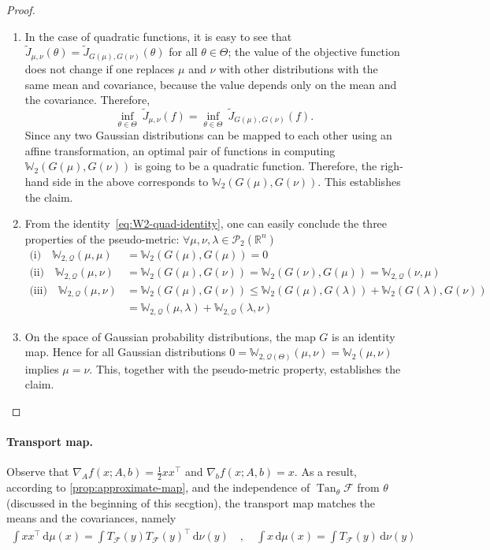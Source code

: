 \documentclass[10pt]{article}
\newcommand{\ud}{\,\mathrm{d}}
\newcommand{\op}[1]{\operatorname{#1}}
\newcommand{\Tan}{\op{Tan}}
\renewcommand{\tilde}{\widetilde}
\newcommand{\real}{\mathbb{R}}
\newcommand{\W}{\mathds{W}}
\newcommand{\calF}{\mathcal{F}}
\newcommand{\Q}{\mathcal{Q}}
\numberwithin{equation}{section}
\begin{document}
\begin{proof}
	\begin{enumerate}
		\item 
		In the case of quadratic functions, it is easy to see that $\tilde J_{\mu,\nu}(\theta) = \tilde J_{G(\mu),G(\nu)}(\theta)$ for all $\theta \in \Theta$; 
		the value of the objective function does not change if one replaces $\mu$ and $\nu$ with other distributions with the same mean and covariance, because the value depends only on the mean and the covariance. Therefore, 
		\begin{equation*}%
		\inf_{\theta\in \Theta}~ \tilde J_{\mu,\nu}(f) = \inf_{\theta\in\Theta}~\tilde J_{G(\mu),G(\nu)}(f).
		\end{equation*}
		Since any two Gaussian distributions can be mapped to each other using an affine transformation, an optimal pair of functions in computing $\W_{2}(G(\mu),G(\nu))$ is going to be a quadratic function. Therefore, the righ-hand side in the above corresponds to $\W_{2}(G(\mu),G(\nu))$. 
		This establishes the claim. 
		
		\item From the identity~\eqref{eq:W2-quad-identity}, one can easily conclude the three properties of the pseudo-metric: $\forall \mu,\nu,\lambda \in \mathcal{P}_2(\real^n)$ 
		\begin{align*}
		\text{(i)}\quad \W_{2,\Q}(\mu,\mu)&=\W_2(G(\mu),G(\mu))= 0\\
		\text{(ii)}\quad \W_{2,\Q}(\mu,\nu) &= \W_2(G(\mu),G(\nu)) = \W_2(G(\nu),G(\mu))=\W_{2,\Q}(\nu,\mu)\\
		\text{(iii)}\quad \W_{2,\Q}(\mu,\nu) &= \W_2(G(\mu),G(\nu)) \leq \W_2(G(\mu),G(\lambda)) + \W_2(G(\lambda),G(\nu)) \\&= \W_{2,\Q}(\mu,\lambda) + \W_{2,\Q}(\lambda,\nu)
		\end{align*}
		\item On the space of Gaussian probability distributions, the map $G$ is an identity map. Hence for all Gaussian distributions $0 = \W_{2,\Q(\Theta)}(\mu,\nu) = \W_2(\mu,\nu)$ implies $\mu=\nu$. This, together with the pseudo-metric property, establishes the claim. 
		
	\end{enumerate}
\end{proof}


\paragraph{Transport map.}
Observe that $\nabla_A f(x;A,b) = \frac{1}{2}x x^\top$ and $\nabla_b f(x;A,b) = x$. As a result, according to \autoref{prop:approximate-map}, and the independence of $\Tan_\theta \calF$ from $\theta$ (discussed in the beginning of this secgtion), the transport map matches the means and the covariances, namely 
\begin{align*}
\int x x^\top \ud \mu(x) = \int T_\calF(y)T_\calF(y)^\top \ud \nu(y) \quad,\quad 
\int x \ud \mu(x) = \int T_\calF(y)\ud \nu(y)
\end{align*}
\end{document}

